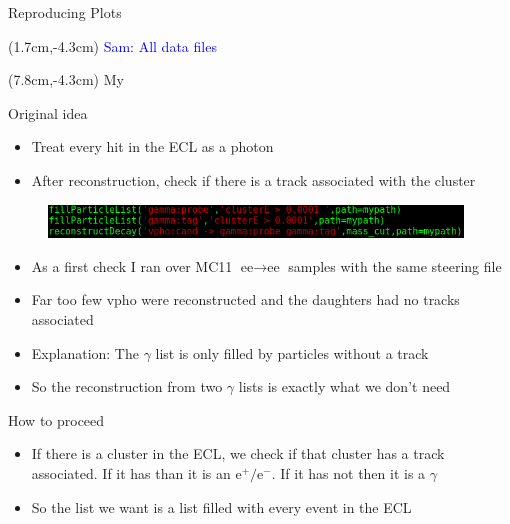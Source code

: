 \documentclass[10pt]{beamer}
\begin{document}
{\begin{frame}{Reproducing Plots}
\begin{figure}
\begin{subfigure}{.5\textwidth}
			\label{fig:sub2}
		\end{subfigure}
		
		\label{fig:test}
	\end{figure}
	
	\begin{textblock*}{\textwidth}(1.7cm,-4.3cm)
		\textcolor{blue}{Sam: All data files}
	\end{textblock*}

	\begin{textblock*}{\textwidth}(7.8cm,-4.3cm)
		My
	\end{textblock*}
	
	
	
\end{frame}




\begin{frame}{Original idea}
		\begin{itemize}
			
		\item Treat every hit in the ECL as a photon
		\item After reconstruction, check if there is a track associated with the cluster
		
	\end{itemize}
	
\begin{figure}
	\includegraphics[width=11cm]{Plots/oldSc}
\end{figure}
\begin{itemize}
	\item As a first check I ran over MC11 $\textrm{ee}\rightarrow\textrm{ee}$ samples with the same steering file
	\item Far too few vpho were reconstructed and the daughters had no tracks associated
	\item Explanation: The $\gamma$ list is only filled by particles without a track
	\item So the reconstruction from two $\gamma$ lists is exactly what we don't need
\end{itemize}
\end{frame}



\begin{frame}{How to proceed}
	\begin{itemize}
		\item If there is a cluster in the ECL, we check if that cluster has a track associated. If it has than it is an $\textrm{e}^+/\textrm{e}^-$. If it has not then it is a $\gamma$ 
		\item So the list we want is a list filled with every event in the ECL 
		

\end{itemize}
\end{frame}}
\end{document}
